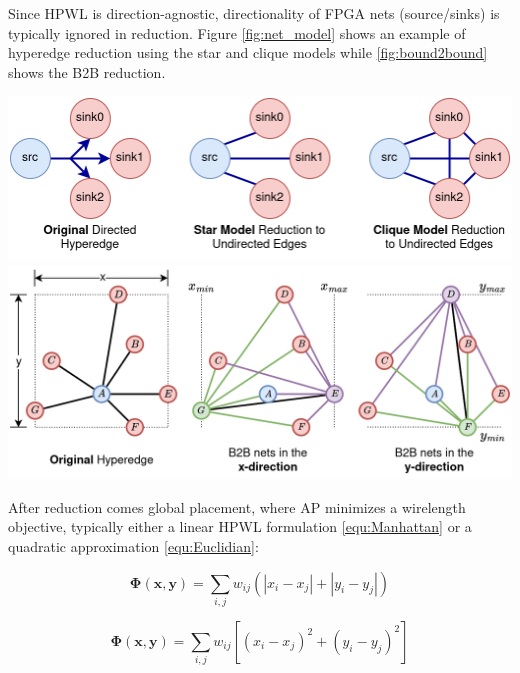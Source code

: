 Since HPWL is direction-agnostic, directionality of FPGA nets (source/sinks) is typically ignored in reduction. 
Figure \ref{fig:net_model} shows an example of hyperedge reduction using the star and clique models while \ref{fig:bound2bound} shows the B2B reduction.

\vspace{1.0cm}
{
    \centering
    \includegraphics[width=\columnwidth]{figures/future_work/net_model.png}
    \label{fig:net_model}
}
{
    \centering
    \includegraphics[width=\columnwidth]{figures/future_work/bound2bound.png}
    \label{fig:bound2bound}
}

After reduction comes global placement, where AP minimizes a wirelength objective, typically either a linear HPWL formulation \eqref{equ:Manhattan} or a quadratic approximation \eqref{equ:Euclidian}:


\begin{equation}
    \boldsymbol{\Phi} (\boldsymbol{x}, \boldsymbol{y}) = \sum_{i,j} w_{ij} \left( |x_i - x_j| + |y_i - y_j| \right)
    \label{equ:Manhattan}
\end{equation}

\begin{equation}
    \boldsymbol{\Phi} (\boldsymbol{x}, \boldsymbol{y}) = \sum_{i,j} w_{ij} \left[ (x_i - x_j)^2 + (y_i - y_j)^2 \right]
    \label{equ:Euclidian}
\end{equation}

